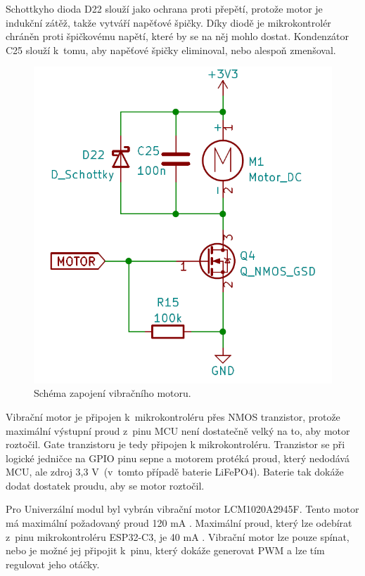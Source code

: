 Schottkyho dioda D22 slouží jako ochrana proti přepětí, protože motor je indukční zátěž, takže vytváří napěťové špičky. Díky diodě je mikrokontrolér chráněn 
proti špičkovému napětí, které by se na něj mohlo dostat. Kondenzátor C25 slouží k~tomu, aby napěťové špičky eliminoval, nebo alespoň zmenšoval. 

\begin{figure}[!h]
  \begin{center}
    \includegraphics[scale=0.4]{obrazky/Vibracni_motor.png}
  \end{center}
  \caption[Schéma zapojení vibračního motoru]{Schéma zapojení vibračního motoru.}
\end{figure}

Vibrační motor je připojen k~mikrokontroléru přes NMOS tranzistor, protože maximální výstupní proud z~pinu MCU není dostatečně velký na to, aby 
motor roztočil. Gate tranzistoru je tedy připojen k mikrokontroléru. Tranzistor se při logické jedničce na GPIO pinu sepne a motorem protéká proud, který 
nedodává MCU, ale zdroj 3,3 V~(v~tomto případě baterie LiFePO4). Baterie tak dokáže dodat dostatek proudu, aby se motor roztočil. 

Pro Univerzální modul byl vybrán vibrační motor LCM1020A2945F. Tento motor má maximální požadovaný proud 120 mA \cite{vib_motor_dtsh}. Maximální 
proud, který lze odebírat z~pinu mikrokontroléru ESP32-C3, je 40 mA \cite{ESP_C3_dtsh}. Vibrační motor lze pouze spínat, nebo je možné jej připojit 
k~pinu, který dokáže generovat PWM a lze tím regulovat jeho otáčky. 

